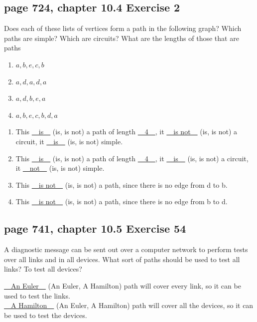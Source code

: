 \documentclass[sigconf]{acmart}
\begin{document}
\subsection{page 724, chapter 10.4 Exercise 2}
\begin{shaded}
    Does each of these lists of vertices form a path in the following graph? Which paths are simple? Which are circuits? What are the lengths of those that are paths
    \begin{enumerate}[label=(\alph*)]
        \item $a, b, e, c, b$
        \item $a, d, a, d, a$
        \item $a, d, b, e, a$
        \item $a, b, e, c, b, d, a$
    \end{enumerate}
\end{shaded}
\begin{enumerate}[label=(\alph*)]
    \item This \uline{~~is~~} (is, is not) a path of length \uline{~~4~~}, it \uline{~~is not~~} (is, is not) a circuit, it \uline{~~is~~} (is, is not) simple.
	
	\item This \uline{~~is~~} (is, is not) a path of length \uline{~~4~~}, it \uline{~~is~~} (is, is not) a circuit, it \uline{~~not~~} (is, is not) simple.

	\item This \uline{~~is not~~} (is, is not) a path, since there is no edge from d to b.

	\item This \uline{~~is not~~} (is, is not) a path, since there is no edge from b to d.
\end{enumerate}

\subsection{page 741, chapter 10.5 Exercise 54}
\begin{shaded}
    A diagnostic message can be sent out over a computer network to perform tests over all links and in all devices. What sort of paths should be used to test all links? To test all devices?
\end{shaded}
\uline{~~An Euler~~} (An Euler, A Hamilton) path will cover every link, so it can be used to test the links.\\
\uline{~~A Hamilton~~} (An Euler, A Hamilton) path will cover all the devices, so it can be used to test the devices.
\end{document}
